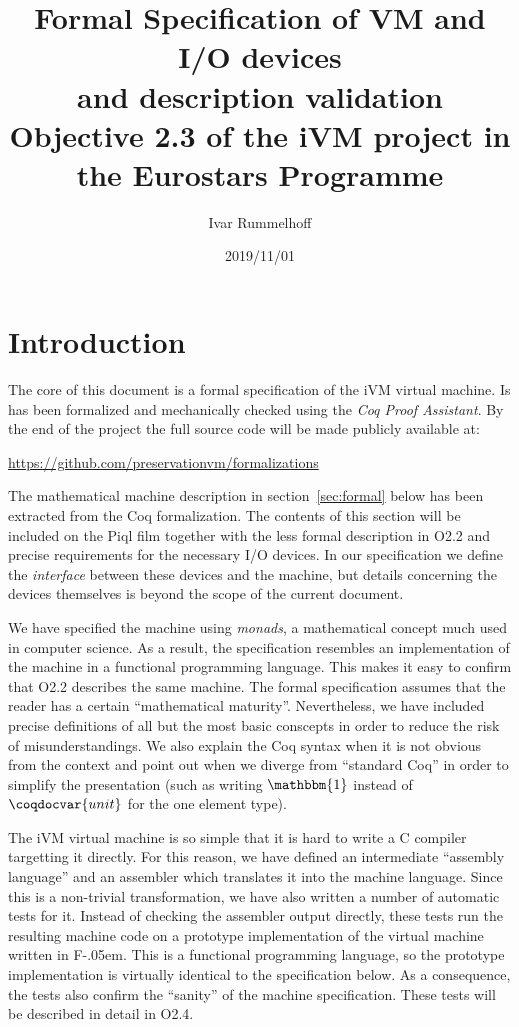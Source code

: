 \documentclass[10pt,a4paper]{article}
\title{%
  Formal Specification of VM and I/O devices\\
  and description validation\\[2ex]
  \large \textbf{Objective 2.3} of the iVM project in the Eurostars Programme
}
\author{Ivar Rummelhoff}
\date{2019/11/01}
\newcommand{\FSharp}{\textsf{F\nolinebreak[4]\kern-.05em\raisebox{.2ex}{\small\#}}\xspace}
\begin{document}
\maketitle

\section{Introduction}

The core of this document is a formal specification of the iVM virtual machine. Is has been formalized and mechanically checked using the \emph{Coq Proof Assistant}. By the end of the project the full source code will be made publicly available at:

\begin{center}
  \url{https://github.com/preservationvm/formalizations}
\end{center}

The mathematical machine description in section~\ref{sec:formal} below has been extracted from the Coq formalization. The contents of this section will be included on the Piql film together with the less formal description in O2.2 and precise requirements for the necessary I/O devices. In our specification we define the \emph{interface} between these devices and the machine, but details concerning the devices themselves is beyond the scope of the current document.

We have specified the machine using \emph{monads}, a mathematical concept much used in computer science. As a result, the specification resembles an implementation of the machine in a functional programming language. This makes it easy to confirm that O2.2 describes the same machine. The formal specification assumes that the reader has a certain ``mathematical maturity''. Nevertheless, we have included precise definitions of all but the most basic conscepts in order to reduce the risk of misunderstandings. We also explain the Coq syntax when it is not obvious from the context and point out when we diverge from ``standard Coq'' in order to simplify the presentation (such as writing $\mathbbm{1}$ instead of $\coqdocvar{unit}$ for the one element type).

The iVM virtual machine is so simple that it is hard to write a C compiler targetting it directly. For this reason, we have defined an intermediate ``assembly language'' and an assembler which translates it into the machine language. Since this is a non-trivial transformation, we have also written a number of automatic tests for it. Instead of checking the assembler output directly, these tests run the resulting machine code on a prototype implementation of the virtual machine written in \FSharp. This is a functional programming language, so the prototype implementation is virtually identical to the specification below. As a consequence, the tests also confirm the ``sanity'' of the machine specification. These tests will be described in detail in O2.4.
\end{document}
